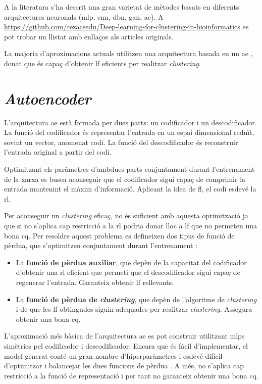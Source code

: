 \documentclass[CAT,BIB]{TFUOC}%
\begin{document}
        A la literatura s'ha descrit una gran varietat de mètodes basats en diferents arquitectures neuronals (\gls{mlp}, \gls{cnn}, \gls{dbn}, \gls{gan}, \gls{ae}). A \url{https://github.com/rezacsedu/Deep-learning-for-clustering-in-bioinformatics} \citep{Karim2021} es pot trobar un llistat amb enllaços als articles originals.

        La majoria d'aproximacions actuals utilitzen una arquitectura basada en un \gls{ae} \citep{Karim2021}, donat que és capaç d'obtenir \gls{lf} eficients per realitzar \textit{clustering}.


    \section{\textit{Autoencoder}}
    \label{s:state_ae}

        L'arquitectura \gls{ae} està formada per dues parts: un codificador i un descodificador. La funció del codificador és representar l'entrada en un espai dimensional reduït, sovint un vector, anomenat codi. La funció del descodificador és reconstruir l'entrada original a partir del codi.

        Optimitzant els paràmetres d'ambdues parts conjuntament durant l'entrenament de la xarxa es busca aconseguir que el codificador sigui capaç de comprimir la entrada mantenint el màxim d'informació. Aplicant la idea de \gls{fl}, el codi esdevé la \gls{rl}.

        Per aconseguir un \textit{clustering} eficaç, no és suficient amb aquesta optimització ja que si no s'aplica cap restricció a la \gls{rl} podria donar lloc a \gls{lf} que no permeten una bona \gls{cq}. Per resoldre aquest problema es defineixen dos tipus de funció de pèrdua, que s'optimitzen conjuntament durant l'entrenament \citep{Min2018}:
        \begin{itemize}
            \item La \textbf{funció de pèrdua auxiliar}, que depèn de la capacitat del codificador d'obtenir una \gls{rl} eficient que permeti que el descodificador sigui capaç de regenerar l'entrada. Garanteix obtenir \gls{lf} rellevants.
            \item La \textbf{funció de pèrdua de \textit{clustering}}, que depèn de l'algoritme de \textit{clustering} i de que les \gls{lf} obtingudes siguin adequades per realitzar \textit{clustering}. Assegura obtenir una bona \gls{cq}.
        \end{itemize}

        L'aproximació més bàsica de l'arquitectura \gls{ae} es pot construir utilitzant \glspl{mlp} simètrics pel codificador i descodificador. Encara que és fàcil d'implementar, el model generat conté un gran nombre d'hiperparàmetres i esdevé difícil d'optimitzar i balancejar les dues funcions de pèrdua \citep{Karim2021}. A més, no s'aplica cap restricció a la funció de representació i per tant no garanteix obtenir una bona \gls{cq}.
\end{document}
